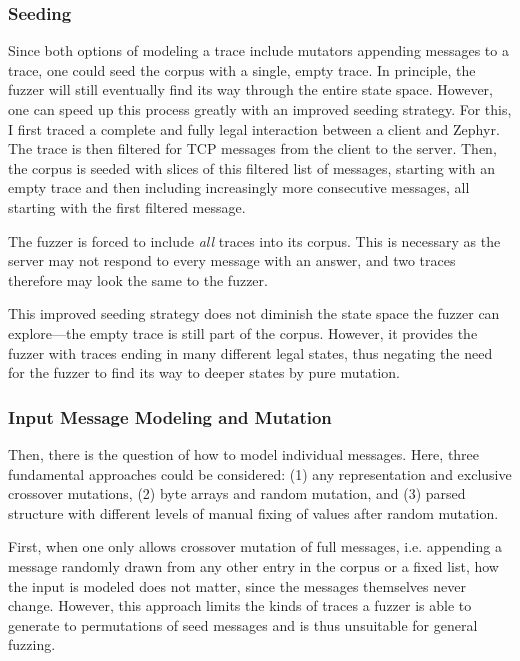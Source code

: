 \documentclass[twocolumn]{article}
\begin{document}
\subsubsection{Seeding}
\label{Implementation:Seeding}

Since both options of modeling a trace include mutators appending messages to a trace, one could seed the corpus with a single, empty trace. In principle, the fuzzer will still eventually find its way through the entire state space. However, one can speed up this process greatly with an improved seeding strategy. For this, I first traced a complete and fully legal interaction between a client and Zephyr. The trace is then filtered for TCP messages from the client to the server. Then, the corpus is seeded with slices of this filtered list of messages, starting with an empty trace and then including increasingly more consecutive messages, all starting with the first filtered message.

The fuzzer is forced to include \textit{all} traces into its corpus. This is necessary as the server may not respond to every message with an answer, and two traces therefore may look the same to the fuzzer.

This improved seeding strategy does not diminish the state space the fuzzer can explore—the empty trace is still part of the corpus. However, it provides the fuzzer with traces ending in many different legal states, thus negating the need for the fuzzer to find its way to deeper states by pure mutation.

\subsubsection{Input Message Modeling and Mutation}
\label{Implementation:InputModeling:MessageModeling}
Then, there is the question of how to model individual messages. Here, three fundamental approaches could be considered: (1) any representation and exclusive crossover mutations, (2) byte arrays and random mutation, and (3) parsed structure with different levels of manual fixing of values after random mutation.

First, when one only allows crossover mutation of full messages, i.e. appending a message randomly drawn from any other entry in the corpus or a fixed list, how the input is modeled does not matter, since the messages themselves never change. However, this approach limits the kinds of traces a fuzzer is able to generate to permutations of seed messages and is thus unsuitable for general fuzzing.
\end{document}
